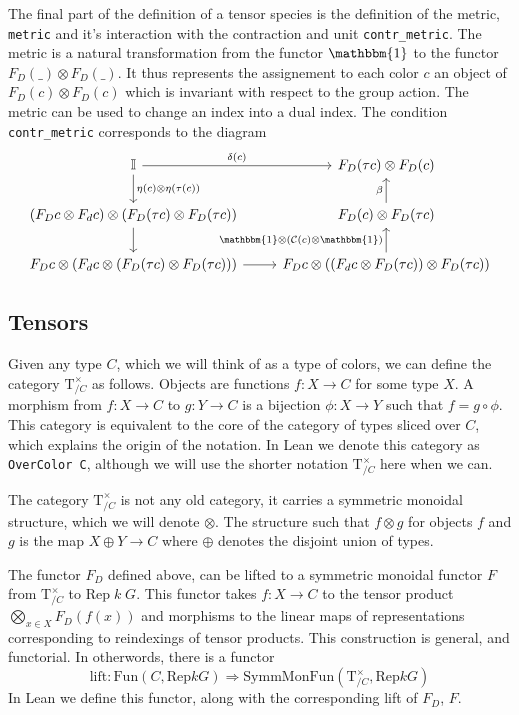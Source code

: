 \documentclass[a4paper, 11pt]{article}
\newcommand{\Rep}[2]{\mathrm{Rep} \; #1 \; #2}
\begin{document}
The final part of the definition of a tensor species is the definition of the metric, \lstinline|metric| 
and it's interaction with the contraction and unit \lstinline|contr_metric|. 
The metric is a natural transformation from the functor $\mathbbm{1}$
to the functor $F_D(\_) \otimes F_D (\_)$. It thus represents the assignement to each color $c$ an object of
$F_D(c) \otimes F_D (c)$ which is invariant with respect to the group action.
The metric can be used to change an index into a dual index. The condition \lstinline|contr_metric|
corresponds to the diagram 
\begin{equation}
  \begin{tikzcd}
    \mathbb{I} \arrow[r, "{\delta(c)}"] \arrow[d, "{\eta(c)\otimes \eta(\tau(c))}"] & F_D(\tau c) \otimes F_D (c) \\ 
    (F_D c \otimes F_d c) \otimes (F_D (\tau c) \otimes F_D (\tau c) ) \arrow [d]  & F_D (c) \otimes F_D(\tau c) \arrow[u, "{\beta}"] \\ 
    F_D c \otimes (F_d c \otimes (F_D (\tau c) \otimes F_D (\tau c) )) \arrow [r] &  F_D c \otimes ((F_d c \otimes F_D (\tau c)) \otimes F_D (\tau c) ) \arrow[u, "{\mathbbm{1} \otimes(\mathcal{C}(c) \otimes \mathbbm{1})}"]
  \end{tikzcd}
\end{equation}

\subsection{Tensors} 



Given any type $C$, which we will think of as a type of colors, we can define 
the category $\mathrm{T}_{/C}^\times$ as follows. Objects are functions 
$f : X \to C$ for some type $X$. A morphism from $f : X \to C$ to $g : Y \to C$ is a bijection
$\phi : X \to Y$ such that $f = g \circ \phi$. This category is equivalent to the core of the
category of types sliced over $C$, which explains the origin of the notation. 
In Lean we denote this category as \lstinline|OverColor C|, although we will use the 
shorter notation $\mathrm{T}_{/C}^\times$ here when we can.

The category $\mathrm{T}_{/C}^\times$ is not any old category, it carries a symmetric monoidal structure, 
which we will denote $\otimes$. The structure such that $f \otimes g$ for objects $f$ and $g$ 
is the map $X \oplus Y \to C$ where $\oplus$ denotes the disjoint union of types. 

The functor $F_D$ defined above, can be lifted to a symmetric monoidal functor $F$ from 
$\mathrm{T}_{/C}^\times$ to $\Rep k G$. This functor takes $f : X \to C$ to the tensor product
$\bigotimes_{x \in X} F_D(f(x))$ and morphisms to the linear maps of representations corresponding to
reindexings of tensor products. This construction is general, and functorial. In otherwords, 
there is a functor 
\begin{equation}
  \mathrm{lift} : \mathrm{Fun}(C, \mathrm{Rep} k G) \Rightarrow
  \mathrm{SymmMonFun}(\mathrm{T}_{/C}^\times, \mathrm{Rep} k G)
\end{equation} 
In Lean we define this functor, along with the corresponding lift of $F_D$, $F$.
\end{document}
